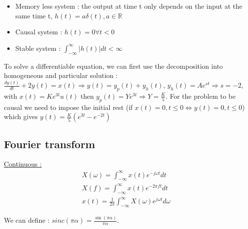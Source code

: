 \documentclass[../main.tex]{subfiles}
\begin{document}
\begin{itemize}
    \item Memory less system : the output at time t only depends on the input at the same time t, $h(t) = a \delta(t), a\in \mathbb{R}$\\
    \item Causal system : $h(t) = 0 \forall t<0$\\
    \item Stable system : $\int_{-\infty}^\infty \lvert h(t) \rvert dt < \infty$\\
\end{itemize}

 To solve a differentiable equation, we can first use the decomposition into homogeneous and particular solution : $\frac{dy(t)}{dt} + 2y(t) = x(t) \Rightarrow y(t) = y_p(t) + y_h(t)$, $y_h(t) = Ae^{st} \Rightarrow s = -2$, with $x(t) = Ke^{3t} u(t)$ then $y_p(t) = Ye^{3t} \Rightarrow Y = \frac{K}{5}$. For the problem to be causal we need to impose the initial rest (if $x(t) = 0, t\leq 0 \Leftrightarrow y(t) = 0, t\leq 0$) which gives $y(t) = \frac{K}{5} (e^{3t} - e^{-2t})$\\

 \subsection{Fourier transform}
\quad \underline{Continuous :}\\
\begin{equation}
    \begin{gathered}
        X(\omega) = \int_{-\infty}^\infty x(t) e^{-j\omega t} dt\\
        X(f) = \int_{-\infty}^\infty x(t) e^{-2\pi f t}dt\\
        x(t) = \frac{1}{2\pi} \int_{-\infty}^\infty X(\omega) e^{j\omega t}d \omega
    \end{gathered}
\end{equation}

We can define : $sinc(\pi \alpha) = \frac{\sin(\pi \alpha)}{\pi \alpha}$.\\
\end{document}

